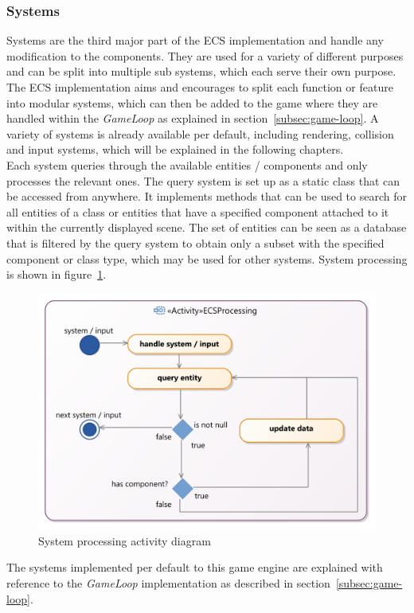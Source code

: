 \subsubsection{Systems}\label{subsubsec:systems}
Systems are the third major part of the ECS implementation and handle any modification to the components.
They are used for a variety of different purposes and can be split into multiple sub systems, which each serve their own purpose.
The ECS implementation aims and encourages to split each function or feature into modular systems, which can then be added to the game where they
are handled within the \textit{GameLoop} as explained in section~\ref{subsec:game-loop}.
A variety of systems is already available per default, including rendering, collision and input systems, which will be explained in the following chapters.
\\
Each system queries through the available entities / components and only processes the relevant ones.
The query system is set up as a static class that can be accessed from anywhere.
It implements methods that can be used to search for all entities of a class or entities that have a specified component
attached to it within the currently displayed scene.
The set of entities can be seen as a database that is filtered by the query system to obtain only a subset with the specified component or class type, which may be used
for other systems.
System processing is shown in figure~\ref{fig:ecs-system-processing}.
\begin{figure}
    \centering
    \includegraphics[width=\textwidth]{Pictures/res/implementation/ecs-system-processing}
    \caption{System processing activity diagram}
    \label{fig:ecs-system-processing}
\end{figure}
The systems implemented per default to this game engine are explained with reference to the \textit{GameLoop} implementation
as described in section~\ref{subsec:game-loop}.
